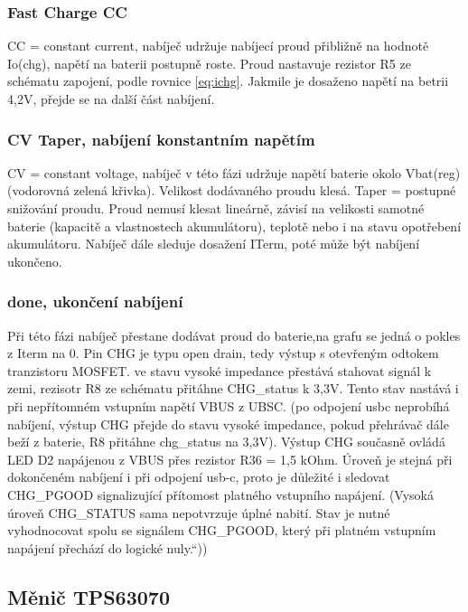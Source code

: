\subsubsection{Fast Charge CC}
CC = constant current, nabíječ udržuje nabíjecí proud přibližně na hodnotě Io(chg), napětí na baterii postupně roste. Proud nastavuje rezistor R5 ze schématu zapojení, podle rovnice \eqref{eq:ichg}. Jakmile je dosaženo napětí na betrii 4,2V, přejde se na další část nabíjení.

\subsubsection{CV Taper, nabíjení konstantním napětím}
CV = constant voltage, nabíječ v této fázi udržuje napětí baterie okolo Vbat(reg) (vodorovná zelená křivka). Velikost dodávaného proudu klesá. Taper = postupné snižování proudu. Proud nemusí klesat lineárně, závisí na velikosti samotné baterie (kapacitě a vlastnostech akumulátoru), teplotě nebo i na stavu opotřebení akumulátoru. Nabíječ dále sleduje dosažení ITerm, poté může být nabíjení ukončeno.

\subsubsection{done, ukončení nabíjení}
Při této fázi nabíječ přestane dodávat proud do baterie,na grafu se jedná o pokles z Iterm na 0. Pin CHG je typu open drain, tedy výstup s otevřeným odtokem tranzistoru MOSFET. ve stavu vysoké impedance přestává stahovat signál k zemi, rezisotr R8 ze schématu přitáhne CHG\_status k 3,3V. Tento stav nastává i při nepřítomném vstupním napětí VBUS z UBSC. (po odpojení usbc neprobíhá nabíjení, výstup CHG přejde do stavu vysoké impedance, pokud přehrávač dále beží z baterie, R8 přitáhne chg\_status na 3,3V). Výstup CHG současně ovládá LED D2 napájenou z VBUS přes rezistor R36 = 1,5 kOhm. Úroveň je stejná při dokončeném nabíjení i při odpojení usb-c, proto je důležité i sledovat CHG\_PGOOD signalizující přítomost platného vstupního napájení. (Vysoká úroveň CHG\_STATUS sama nepotvrzuje úplné nabití. Stav je nutné vyhodnocovat spolu se signálem CHG\_PGOOD, který při platném vstupním napájení přechází do logické nuly.“))



\newpage
\subsection{Měnič TPS63070}
\label{teorie_tps63070}

